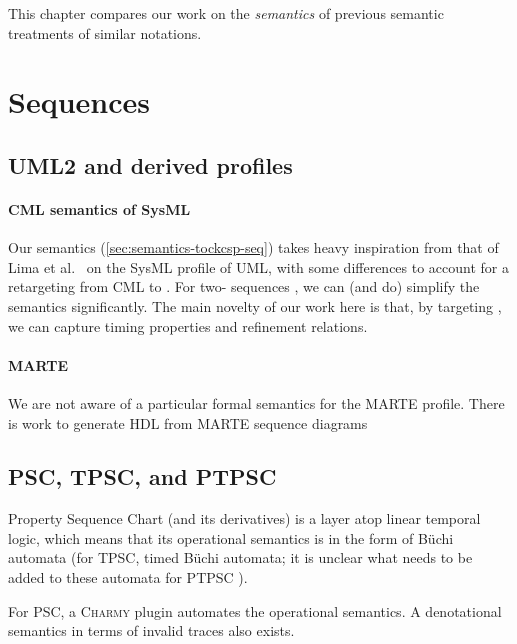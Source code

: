 
This chapter compares our work on the \emph{semantics} of \langname{}
previous semantic treatments of similar notations.

\section{Sequences}\label{sec:semantics-review-seq}

\subsection{UML2 and derived profiles}

\paragraph{CML semantics of SysML}

Our semantics (\cref{sec:semantics-tockcsp-seq}) takes heavy inspiration from
that of Lima et al.~\cite{lima-semantics} on the SysML profile of UML, with
some differences to account for a retargeting from CML to \tockcsp.  For
two-\mactor{} sequences , we can (and do)
simplify the semantics significantly.
The main novelty of our work here is that, by targeting \tockcsp, we can capture
timing properties and refinement relations.

\paragraph{MARTE}

We are not aware of a particular formal semantics for the MARTE profile.
There is work to generate HDL from MARTE sequence diagrams~

\subsection{PSC, TPSC, and PTPSC}

Property Sequence Chart (and its derivatives) is a layer atop
linear temporal logic, which means that its operational semantics is
in the form of B\"uchi automata (for TPSC, timed B\"uchi
automata; it is unclear what needs to be added to these automata for PTPSC ).

For PSC, a \textsc{Charmy} plugin automates the operational semantics.  A denotational semantics in terms of
invalid traces also exists.